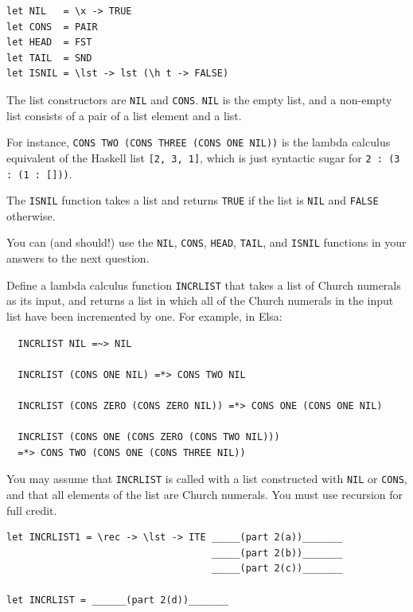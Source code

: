 \documentclass[addpoints]{exam}
\begin{document}
\begin{questions}
\begin{verbatim}
let NIL   = \x -> TRUE
let CONS  = PAIR
let HEAD  = FST
let TAIL  = SND
let ISNIL = \lst -> lst (\h t -> FALSE)
\end{verbatim}

The list constructors are \texttt{NIL} and \texttt{CONS}.  \texttt{NIL} is the empty list, and a non-empty list consists of a pair of a list element and a list.

For instance, \texttt{CONS TWO (CONS THREE (CONS ONE NIL))} is the lambda calculus equivalent of the Haskell list \texttt{[2, 3, 1]}, which is just syntactic sugar for \texttt{2 : (3 : (1 : []))}.

The \texttt{ISNIL} function takes a list and returns \texttt{TRUE} if the list is \texttt{NIL} and \texttt{FALSE} otherwise.

You can (and should!) use the \texttt{NIL}, \texttt{CONS}, \texttt{HEAD}, \texttt{TAIL}, and \texttt{ISNIL} functions in your answers to the next question.

\newpage

\question Define a lambda calculus function \texttt{INCRLIST} that takes a list of Church numerals as its input, and returns a list in which all of the Church numerals in the input list have been incremented by one.  For example, in Elsa:

\begin{verbatim}
  INCRLIST NIL =~> NIL

  INCRLIST (CONS ONE NIL) =*> CONS TWO NIL

  INCRLIST (CONS ZERO (CONS ZERO NIL)) =*> CONS ONE (CONS ONE NIL)

  INCRLIST (CONS ONE (CONS ZERO (CONS TWO NIL)))
  =*> CONS TWO (CONS ONE (CONS THREE NIL))
\end{verbatim}

You may assume that \texttt{INCRLIST} is called with a list constructed with \texttt{NIL} or \texttt{CONS}, and that all elements of the list are Church numerals.  You must use recursion for full credit.

\begin{verbatim}
let INCRLIST1 = \rec -> \lst -> ITE _____(part 2(a))_______
                                    _____(part 2(b))_______
                                    _____(part 2(c))_______
                      
let INCRLIST = ______(part 2(d))_______
\end{verbatim}

\begin{parts} 

\end{parts}
\end{questions}
\end{document}
